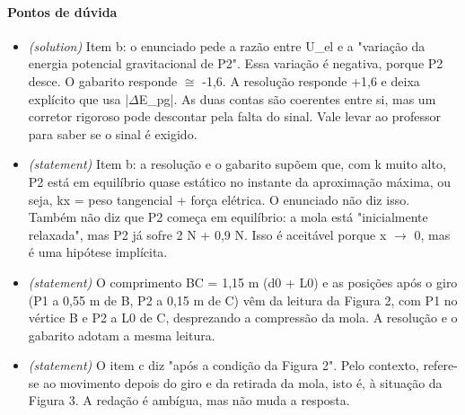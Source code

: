 \documentclass{article}%
\begin{document}
\paragraph{Pontos de dúvida}%
\begin{itemize}%
\item%
\textit{(solution)} Item b: o enunciado pede a razão entre U\_el e a "variação da energia potencial gravitacional de P2". Essa variação é negativa, porque P2 desce. O gabarito responde $\cong$ -1,6. A resolução responde +1,6 e deixa explícito que usa |$\Delta$E\_pg|. As duas contas são coerentes entre si, mas um corretor rigoroso pode descontar pela falta do sinal. Vale levar ao professor para saber se o sinal é exigido.%
\item%
\textit{(statement)} Item b: a resolução e o gabarito supõem que, com k muito alto, P2 está em equilíbrio quase estático no instante da aproximação máxima, ou seja, kx = peso tangencial + força elétrica. O enunciado não diz isso. Também não diz que P2 começa em equilíbrio: a mola está "inicialmente relaxada", mas P2 já sofre 2 N + 0,9 N. Isso é aceitável porque x $\to$ 0, mas é uma hipótese implícita.%
\item%
\textit{(statement)} O comprimento BC = 1,15 m (d0 + L0) e as posições após o giro (P1 a 0,55 m de B, P2 a 0,15 m de C) vêm da leitura da Figura 2, com P1 no vértice B e P2 a L0 de C, desprezando a compressão da mola. A resolução e o gabarito adotam a mesma leitura.%
\item%
\textit{(statement)} O item c diz "após a condição da Figura 2". Pelo contexto, refere{-}se ao movimento depois do giro e da retirada da mola, isto é, à situação da Figura 3. A redação é ambígua, mas não muda a resposta.%
\end{itemize}%
\end{document}
